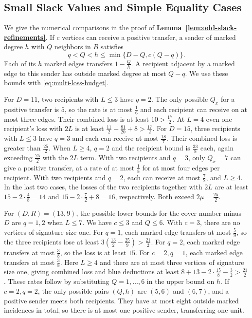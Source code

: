\subsection{Small Slack Values and Simple Equality Cases}
\label{app:multi-structure}

We give the numerical comparisons in the proof of
\textbf{Lemma~\ref{lem:odd-slack-refinements}}. If $c$ vertices
can receive a positive transfer, a sender of marked degree $h$ with
$Q$ neighbors in $B$ satisfies
\[
  q<Q<h\le\min\{D-Q,c(Q-q)\}.
\]
Each of its $h$ marked edges transfers $1-\frac{Q}{h}$. A recipient
adjacent by a marked edge to this sender has outside marked degree
at most $Q-q$. We use these bounds with \eqref{eq:multi-loss-budget}.

For $D=11$, two recipients with $L\le3$ have $q=2$. The only
possible $Q_x$ for a positive transfer is $5$, so the rate
is at most $\frac{1}{6}$ and each recipient can receive on at most
three edges. Their combined loss is at least $10>\frac{17}{2}$.
At $L=4$ even one recipient's loss with $2L$ is at least
$\frac{11}{2}-\frac{81}{20}+8>\frac{17}{2}$. For $D=15$, three recipients with
$L\le3$ have $q=3$ and each can receive at most $\frac{18}{7}$.
Their combined loss is greater than $\frac{25}{2}$. When $L\ge4$,
$q=2$ and the recipient bound is $\frac{33}{8}$ each, again exceeding
$\frac{25}{2}$ with the $2L$ term. With two recipients and $q=3$,
only $Q_x=7$ can give a positive transfer, at a rate of at most
$\frac{1}{8}$ for at most four edges per recipient. With two recipients
and $q=2$, each can receive at most $\frac{7}{2}$, and $L\ge4$.
In the last two cases, the losses of the two recipients together
with $2L$ are at least $15-2\cdot\frac{4}{8}=14$ and
$15-2\cdot\frac{7}{2}+8=16$, respectively. Both exceed
$2\mu=\frac{25}{2}$.

For $(D,R)=(13,9)$, the possible lower bounds for the cover number
minus $D$ are $q=1,2$ when $L\le7$. We have $c\le3$ and $Q\le6$.
With $c=3$, there are no vertices of signature size one.
For $q=1$, each marked edge transfers at most $\frac{5}{9}$, so the
three recipients lose at least $3(\frac{13}{2}-\frac{25}{9})>\frac{21}{2}$.
For $q=2$, each marked edge transfers at most $\frac{3}{8}$, so the
loss is at least $15$. For $c=2,q=1$, each marked edge transfers at
most $\frac{3}{8}$. Here $L\ge4$ and there are at most three vertices
of signature size one, giving combined loss and blue deductions
at least $8+13-2\cdot\frac{15}{8}-\frac{3}{2}>\frac{21}{2}$.
These rates follow by substituting $Q=1,\ldots,6$ in the upper bound
on $h$. If $c=2,q=2$, the only possible pairs $(Q,h)$ are
$(5,6)$ and $(6,7)$, and a positive sender meets both recipients.
They have at most eight outside marked incidences in total, so
there is at most one positive sender, transferring one unit.

